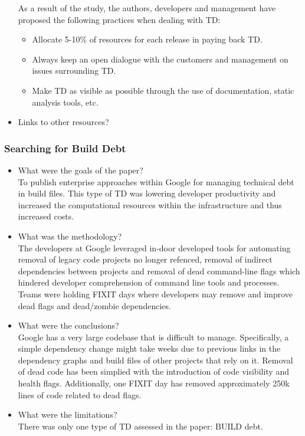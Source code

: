 \documentclass{mprop}
\begin{document}
\begin{itemize}
As a result of the study, the authors, developers and management have proposed the following practices when dealing with TD:
\begin{itemize}
	\item Allocate 5-10\% of resources for each release in paying back TD.
	\item Always keep an open dialogue with the customers and management on issues surrounding TD.
	\item Make TD as visible as possible through the use of documentation, static analysis tools, etc.
\end{itemize}
\item Links to other resources? \\
\end{itemize}

\subsubsection{Searching for Build Debt} \cite{Morgenthaler2012}
\begin{itemize}
\item What were the goals of the paper? \\
To publish enterprise approaches within Google for managing technical debt in build files.
This type of TD was lowering developer productivity and increased the computational resources within the infrastructure and thus increased costs.
\item What was the methodology? \\
The developers at Google leveraged in-door developed tools for automating removal of legacy code projects no longer refenced, removal of indirect dependencies between projects and removal of dead command-line flags which hindered developer comprehension of command line tools and processes.
Teams were holding FIXIT days where developers may remove and improve dead flags and dead/zombie dependencies.
\item What were the conclusions? \\
Google has a very large codebase that is difficult to manage. 
Specifically, a simple dependency change might take weeks due to previous links in the dependency graphs and build files of other projects that rely on it.
Removal of dead code has been simplied with the introduction of code visibility and health flags. 
Additionally, one FIXIT day has removed approximately 250k lines of code related to dead flags.
\item What were the limitations? \\
There was only one type of TD assessed in the paper: BUILD debt.
\end{itemize}
\end{document}

